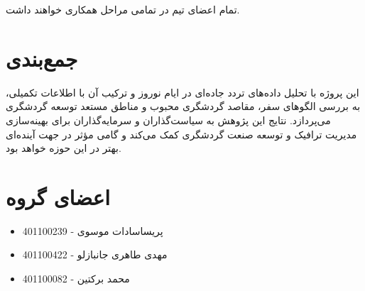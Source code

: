 \documentclass[a4paper, 12pt]{article}
\begin{document}
تمام اعضای تیم در تمامی مراحل همکاری خواهند داشت.


\section{جمع‌بندی}
این پروژه با تحلیل داده‌های تردد جاده‌ای در ایام نوروز و ترکیب آن با اطلاعات تکمیلی، به بررسی الگوهای سفر، مقاصد گردشگری محبوب و مناطق مستعد توسعه گردشگری می‌پردازد. نتایج این پژوهش به سیاست‌گذاران و سرمایه‌گذاران برای بهینه‌سازی مدیریت ترافیک و توسعه صنعت گردشگری کمک می‌کند و گامی مؤثر در جهت آینده‌ای بهتر در این حوزه خواهد بود.

\section{اعضای گروه}
\begin{itemize}
    \item پریساسادات موسوی - 401100239
    \item مهدی طاهری جانبازلو - 401100422
    \item محمد برکتین - 401100082
\end{itemize}
\end{document}
